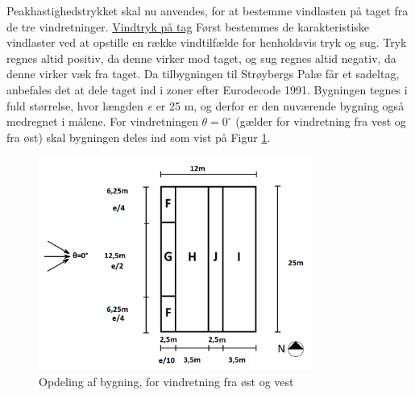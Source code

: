 Peakhastighedstrykket skal nu anvendes, for at bestemme vindlasten på taget fra de tre vindretninger.
\newline
\newline
\underline{Vindtryk på tag}
\newline
Først bestemmes de karakteristiske vindlaster ved at opstille en række vindtilfælde for henholdsvis tryk og sug. Tryk regnes altid positiv, da denne virker mod taget, og sug regnes altid negativ, da denne virker væk fra taget.
\newline
\newline
Da tilbygningen til Strøybergs Palæ får et sadeltag, anbefales det at dele taget ind i zoner efter Eurodecode 1991. Bygningen tegnes i fuld størrelse, hvor længden \textit{e} er 25 m, og derfor er den nuværende bygning også medregnet i målene. For vindretningen $\theta = 0^{\circ}$ (gælder for vindretning fra vest og fra øst) skal bygningen deles ind som vist på Figur \ref{fig:opdeling}.  

\begin{figure}[htbp]
	\centering
	\includegraphics[width=0.8\textwidth]{billeder/opdeling.png}
	\caption{Opdeling af bygning, for vindretning fra øst og vest \citep[ kapitel 7.2.5]{EU91}}
	\label{fig:opdeling}
\end{figure}

